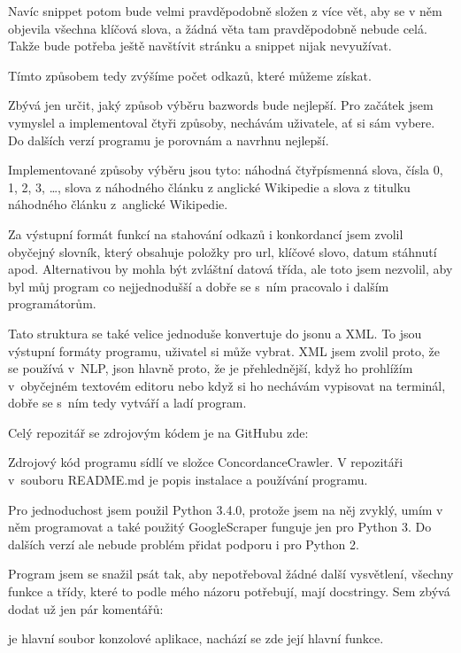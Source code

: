 Navíc snippet potom bude velmi pravděpodobně složen z více vět, aby se
v něm objevila všechna klíčová slova, a žádná věta tam pravděpodobně nebude
celá. Takže bude potřeba ještě navštívit stránku a snippet nijak nevyužívat.

Tímto způsobem tedy zvýšíme počet odkazů, které můžeme získat.

Zbývá jen určit, jaký způsob výběru bazwords bude nejlepší. Pro začátek
jsem vymyslel a implementoval čtyři způsoby, nechávám uživatele, ať si sám
vybere. Do dalších verzí programu je porovnám a navrhnu nejlepší.

Implementované způsoby výběru jsou tyto: náhodná čtyřpísmenná slova, čísla
0, 1, 2, 3, \dots, slova z náhodného článku z anglické Wikipedie a slova z titulku
náhodného článku z~anglické Wikipedie.

Za výstupní formát funkcí na stahování odkazů i konkordancí jsem zvolil
obyčejný slovník, který obsahuje položky pro url, klíčové slovo, datum
stáhnutí apod. Alternativou by mohla být zvláštní datová třída, ale toto
jsem nezvolil, aby byl můj program co nejjednodušší a dobře se s~ním
pracovalo i dalším programátorům.

Tato struktura se také velice jednoduše konvertuje do jsonu a XML. To jsou
výstupní formáty programu, uživatel si může vybrat. XML jsem zvolil proto,
že se používá v~NLP, json hlavně proto, že je přehlednější, když ho
prohlížím v~obyčejném textovém editoru nebo když si ho nechávám vypisovat
na terminál, dobře se s~ním tedy vytváří a ladí program.


Celý repozitář se zdrojovým kódem je na GitHubu zde:


Zdrojový kód programu sídlí ve složce ConcordanceCrawler. V repozitáři
v~souboru README.md je popis instalace a používání programu.

Pro jednoduchost jsem použil Python 3.4.0, protože jsem na něj zvyklý, umím
v něm programovat a také použitý GoogleScraper funguje jen pro Python 3. Do dalších
verzí ale nebude problém přidat podporu i pro Python 2.

Program jsem se snažil psát tak, aby nepotřeboval žádné další vysvětlení,
všechny funkce a třídy, které to podle mého názoru potřebují, mají
docstringy. Sem zbývá dodat už jen pár komentářů:

\bigskip
\od
{} je hlavní soubor konzolové aplikace, nachází se zde její
hlavní funkce.

